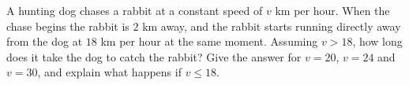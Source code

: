 A hunting dog chases a rabbit at a constant speed of $v$ km per hour. When the chase begins the rabbit is $2$ km away, and the rabbit starts running directly away from the dog at $18$ km per hour at the same moment. Assuming $v>18$, how long does it take the dog to catch the rabbit? Give the answer for $v=20$, $v=24$ and $v=30$, and explain what happens if $v\le18$.
